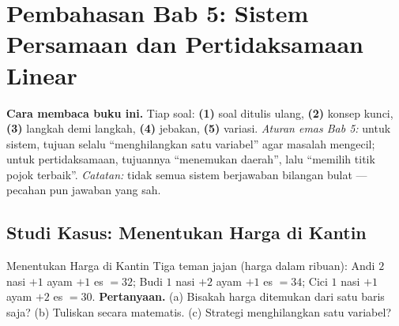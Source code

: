 
\renewcommand{\babjudul}{Pembahasan Latihan — Bab 5}


\setcounter{chapter}{5}

\chapter*{Pembahasan Bab 5: Sistem Persamaan dan Pertidaksamaan Linear}

\begin{tips}
\textbf{Cara membaca buku ini.} Tiap soal: \textbf{(1)} soal ditulis ulang,
\textbf{(2)} konsep kunci, \textbf{(3)} langkah demi langkah, \textbf{(4)}
jebakan, \textbf{(5)} variasi. \emph{Aturan emas Bab 5:} untuk sistem, tujuan
selalu ``menghilangkan satu variabel'' agar masalah mengecil; untuk
pertidaksamaan, tujuannya ``menemukan daerah'', lalu ``memilih titik pojok
terbaik''. \emph{Catatan:} tidak semua sistem berjawaban bilangan bulat ---
pecahan pun jawaban yang sah.
\end{tips}

\section*{Studi Kasus: Menentukan Harga di Kantin}

\begin{studikasus}{Menentukan Harga di Kantin}
Tiga teman jajan (harga dalam ribuan): Andi $2$ nasi $+1$ ayam $+1$ es $=32$;
Budi $1$ nasi $+2$ ayam $+1$ es $=34$; Cici $1$ nasi $+1$ ayam $+2$ es $=30$.
\textbf{Pertanyaan.} (a) Bisakah harga ditemukan dari satu baris saja?
(b) Tuliskan secara matematis. (c) Strategi menghilangkan satu variabel?
\end{studikasus}


